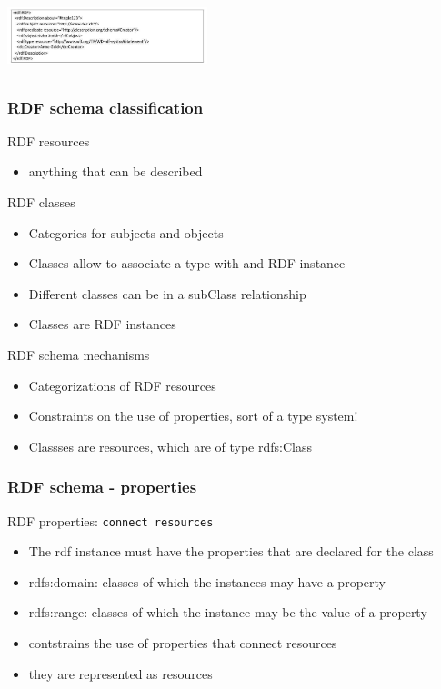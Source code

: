 \includegraphics[width=220px, height=80px]{reificationsynt}

\subsubsection{RDF schema classification}

RDF resources
\begin{itemize}
\item anything that can be described
\end{itemize}
RDF classes
\begin{itemize}
\item Categories for subjects and objects
\item Classes allow to associate a type with and RDF instance
\item Different classes can be in a subClass relationship
\item Classes are RDF instances
\end{itemize}
RDF schema mechanisms
\begin{itemize}
\item Categorizations of RDF resources
\item Constraints on the use of properties, sort of a type system!
\item Classses are resources, which are of type rdfs:Class
\end{itemize}

\subsubsection{RDF schema - properties}
RDF properties: \texttt{connect resources}
\begin{itemize}
\item The rdf instance must have the properties that are declared for
  the class
\item rdfs:domain: classes of which the instances may have a property
\item rdfs:range: classes of which the instance may be the value of a
  property
\item contstrains the use of properties that connect resources
\item they are represented as resources
\end{itemize}

